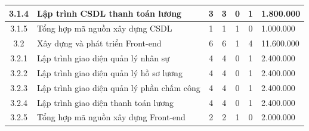 \begin{longtable}{|c|p{3cm}|c|c|c|c|p{3cm}|}
    3.1.4                           & Lập trình CSDL thanh toán lương                               & 3                                              & 3                                               & 0                                                               & 1                  & 1.800.000  \\ \hline
    3.1.5                           & Tổng hợp mã nguồn xây dựng CSDL                               & 1                                              & 1                                               & 1                                                               & 0                  & 1.000.000  \\ \hline
    3.2                             & Xây dựng và phát triển Front-end                              & 6                                              & 6                                               & 1                                                               & 4                  & 11.600.000 \\ \hline
    3.2.1                           & Lập trình giao diện quản lý nhân sự                           & 4                                              & 4                                               & 0                                                               & 1                  & 2.400.000  \\ \hline
    3.2.2                           & Lập trình giao diện quản lý hồ sơ lương                       & 4                                              & 4                                               & 0                                                               & 1                  & 2.400.000  \\ \hline
    3.2.3                           & Lập trình giao diện quản lý phần chấm công                    & 4                                              & 4                                               & 0                                                               & 1                  & 2.400.000  \\ \hline
    3.2.4                           & Lập trình giao diện thanh toán lương                          & 4                                              & 4                                               & 0                                                               & 1                  & 2.400.000  \\ \hline
    3.2.5                           & Tổng hợp mã nguồn xây dựng Front-end                          & 2                                              & 2                                               & 1                                                               & 0                  & 2.000.000  \\ \hline

\end{longtable}
